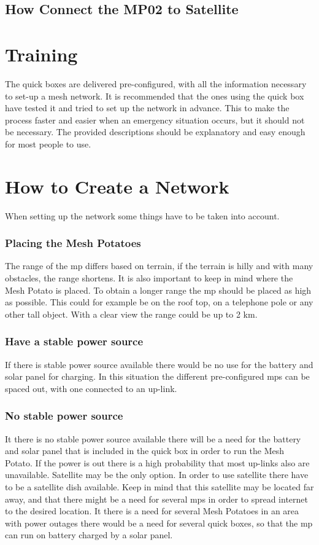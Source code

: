 
\clearpage

 
\clearpage
\subsection{How Connect the MP02 to Satellite}


\section{Training}
The \gls{quick} boxes are delivered pre-configured, with all the  information necessary to set-up a mesh network. It is recommended that the ones using the \gls{quick} box have tested it and tried to set up the network in advance. This to make the process faster and easier when an emergency situation occurs, but it should not be necessary. The provided descriptions should be explanatory and easy enough for most people to use.


\section{How to Create a Network}
When setting up the network some things have to be taken into account. 

\subsubsection{Placing the Mesh Potatoes}
The range of the \gls{mp} differs based on terrain, if the terrain is hilly and with many obstacles, the range shortens. It is also important to keep in mind where the Mesh Potato is placed. To obtain a longer range the \gls{mp} should be placed as high as possible. This could for example be on the roof top, on a telephone pole or any other tall object. With a clear view the range could be up to 2 km. 

\subsubsection{Have a stable power source}
If there is stable power source available there would be no use for the battery and solar panel for charging. In this situation the different pre-configured \glspl{mp} can be spaced out, with one connected to an up-link. 

\subsubsection{No stable power source}
It there is no stable power source available there will be a need for the battery and solar panel that is included in the \gls{quick} box in order to run the Mesh Potato. If the power is out there is a high probability that most up-links also are unavailable. Satellite may be the only option. In order to use satellite there have to be a satellite dish available. Keep in mind that this satellite may be located far away, and that there might be a need for several \glspl{mp} in order to spread internet to the desired location. It there is a need for several Mesh Potatoes in an area with power outages there would be a need for several \gls{quick} boxes, so that the \gls{mp} can run on battery charged by a solar panel. 
